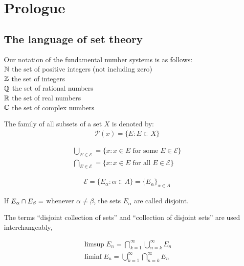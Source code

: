 
\setchapterpreamble[u]{\margintoc}
\chapter{Prologue}

\section{The language of set theory}

\begin{definition}
    Our notation of the fundamental number systems is as follows: \\
    $\mathbb{N}$ the set of positive integers (not including zero) \\
    $\mathbb{Z}$ the set of integers \\
    $\mathbb{Q}$ the set of rational numbers \\
    $\mathbb{R}$ the set of real numbers \\
    $\mathbb{C}$ the set of complex numbers
\end{definition}

The family of all subsets of a set $X$ is denoted by:
\begin{align}
    \mathcal{P}(x) = \{ E : E \subset X \}
\end{align}

\begin{align}
    \bigcup_{E \in \mathcal{E}} = \{ x : x\in E \text{ for some } E \in \mathcal{E} \} \\
    \bigcap_{E \in \mathcal{E}} = \{ x : x\in E \text{ for all } E \in \mathcal{E} \}
\end{align}

\begin{align}
    \mathcal{E} = \{ E_{\alpha} : \alpha \in A \} = \{E_{\alpha}\}_{\alpha \in A}
\end{align}

If $E_{\alpha} \cap E_{\beta} = \empty$ whenever $\alpha \ne \beta$, the sets $E_{\alpha}$ are called disjoint.

The terms ``disjoint collection of sets'' and ``collection of disjoint sets'' are used interchangeably,

\begin{align}
    \limsup E_n = \bigcap_{k=1}^{\infty} \bigcup_{n=k}^{\infty} E_n \\
    \liminf E_n = \bigcup_{k=1}^{\infty} \bigcap_{n=k}^{\infty} E_n
\end{align}

